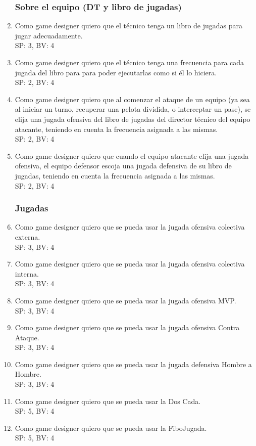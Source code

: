 \documentclass[a4paper, 10pt, twoside]{article}
\begin{document}
\begin{enumerate}
    \subsubsection{Sobre el equipo (DT y libro de jugadas)}
    \item  Como game designer quiero que el t\'ecnico tenga un libro de jugadas para jugar adecuadamente.
    \\SP: 3, BV: 4
    \item Como game designer quiero que el t\'ecnico tenga una frecuencia para cada jugada del libro para para poder ejecutarlas como si \'el lo hiciera.
    \\SP: 2, BV: 4
    \item  Como game designer quiero que al comenzar el ataque de un equipo (ya sea al iniciar un turno, recuperar una pelota dividida, o interceptar un pase), se elija una jugada ofensiva del libro de jugadas del director t\'ecnico del equipo atacante, teniendo en cuenta la frecuencia asignada a las mismas.
    \\SP: 2, BV: 4
    \item Como game designer quiero que cuando el equipo atacante elija una jugada ofensiva, el equipo defensor escoja una jugada defensiva de su libro de jugadas, teniendo en cuenta la frecuencia asignada a las mismas.
    \\SP: 2, BV: 4
    \subsubsection{Jugadas}
    \item Como game designer quiero que se pueda usar la jugada ofensiva colectiva externa. 
    \\SP: 3, BV: 4
    \item Como game designer quiero que se pueda usar la jugada ofensiva colectiva interna.
    \\SP: 3, BV: 4
    \item Como game designer quiero que se pueda usar la jugada ofensiva MVP.
    \\SP: 3, BV: 4
    \item Como game designer quiero que se pueda usar la jugada ofensiva Contra Ataque.
    \\SP: 3, BV: 4
    \item Como game designer quiero que se pueda usar la jugada defensiva Hombre a Hombre.
    \\SP: 3, BV: 4
    \item Como game designer quiero que se pueda usar la Dos Cada.
    \\SP: 5, BV: 4
    \item Como game designer quiero que se pueda usar la FiboJugada.
    \\SP: 5, BV: 4

\end{enumerate}
\end{document}
